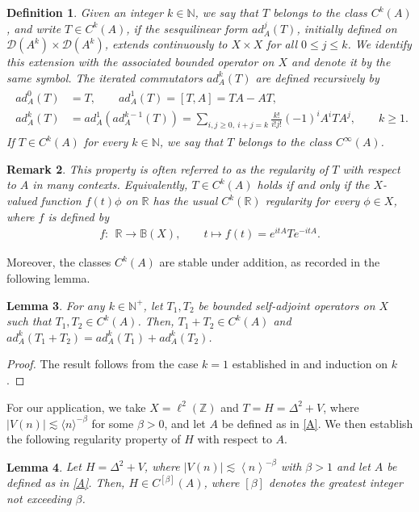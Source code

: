 \documentclass[reqno, 11pt]{amsart}
\newtheorem{definition}{Definition}[section]
\newtheorem{lemma}[definition]{Lemma}
\newtheorem{remark}[definition]{Remark}
\newcommand\R{\mathbb{R}}
\newcommand\Z{\mathbb{Z}}
\newcommand\B{\mathbb{B}}
\newcommand\N{\mathbb{N}}
\newcommand\mcaD{\mathcal{D}}
\numberwithin{equation}{section}
\begin{document}
\begin{definition}\label{def of regularity}
{\rm
Given an integer $k\in\N$, we say that $T$ belongs to the class $C^{k}(A)$, and write $T\in C^{k}(A)$, if the sesquilinear form $ad^{j}_{A}(T)$, initially defined on $\mcaD(A^k)\times\mcaD(A^k)$, extends continuously to $X\times X$ for all $0\leq j\leq k$. We identify this extension with the associated bounded operator on $X$ and denote it by the same symbol. The iterated commutators $ad^{k}_{A}(T)$ are defined recursively by
\begin{align}\label{adk}
\begin{split}
ad^{0}_A(T)&=T,\qquad
ad^{1}_{A}(T)=[T,A]=TA-AT,\\
ad^{k}_{A}(T)&=ad^{1}_{A}\left(ad^{k-1}_{A}(T)\right)=\sum\limits_{i,j\geq0,\ i+j=k}^{}\frac{k!}{i!j!}(-1)^{i}A^{i}TA ^{j},\qquad k\geq1.
\end{split}
\end{align}
If $T\in C^k(A)$ for every $k\in\N$, we say that $T$ belongs to the class $C^\infty(A)$.
}
\end{definition}
\begin{remark}
{\rm This property is often referred to as the regularity of $T$ with respect to $A$ in many contexts. Equivalently,  $T\in C^{k}(A)$ holds if and only if the $X$-valued function $f(t)\phi$ on $\R$ has the usual $C^{k}(\R)$ regularity for every $\phi\in X$, where $f$ is defined by
\begin{align*}
f:~~\R\longrightarrow\B(X),\qquad t\longmapsto f(t)=e^{itA}Te^{-itA}.
\end{align*}}
\end{remark}
Moreover, the classes $C^k(A)$ are stable under addition, as recorded in the following lemma.
\begin{lemma}\label{Regularity lemma}
{  For any $k\in\N^{+}$, let $T_1,T_2$ be bounded self-adjoint operators on $X$ such that $T_1,T_2\in C^{k}(A)$. Then, $T_1+T_2\in C^{k}(A)$ and $ad^{k}_{A}(T_1+T_2)=ad^{k}_{A}(T_1)+ad^{k}_{A}(T_2)$.
}
\end{lemma}
\begin{proof}
The result follows from the case $k=1$ established in \cite[Section 2]{GGM04} and induction on $k$.
\end{proof}
For our application, we take $X=\ell^2(\Z)$ and $T=H=\Delta^2+V$, where $|V(n)|\lesssim \langle n\rangle^{-\beta}$ for some $\beta>0$, and let $A$ be defined as in \eqref{A}. We then establish the following regularity property of $H$ with respect to $A$.
\begin{lemma}\label{regularity of H}
{ Let $H=\Delta^2+V$, where $|V(n)|\lesssim \left<n\right>^{-\beta}$ with $\beta>1$ and let $A$ be defined as in \eqref{A}. Then, $H\in C^{[\beta]}(A)$, where $[\beta]$ denotes the greatest integer not exceeding $\beta$.}
\end{lemma}
\end{document}
